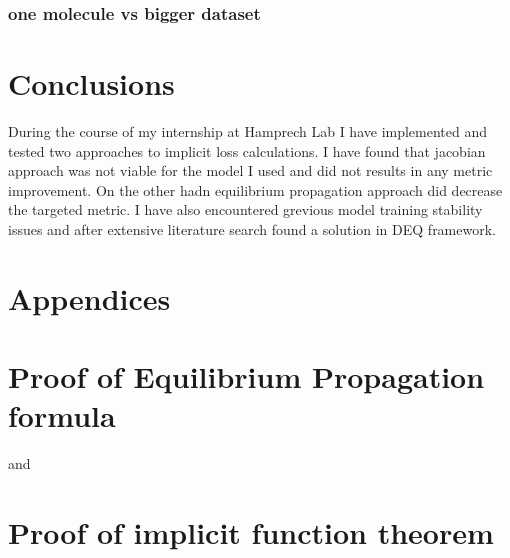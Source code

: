 \documentclass[a4paper,10pt]{report}
\begin{document}
\subsubsection{one molecule vs bigger dataset}

\section{Conclusions}
During the course of my internship at Hamprech Lab I have implemented and tested two approaches to implicit loss calculations. I have found that jacobian approach was not viable for the model I used and did not results in any metric improvement.
On the other hadn equilibrium propagation approach did decrease the targeted metric. I have also encountered grevious model training stability issues and after extensive literature search found a solution in DEQ framework.
\nocite{*}




\section{Appendices}
\appendix
\section{Proof of Equilibrium Propagation formula}
and

\appendix
\section{Proof of implicit function theorem}
\end{document}

